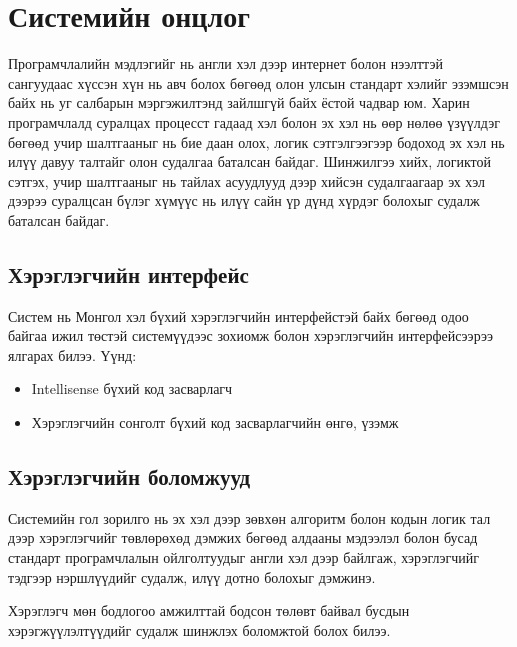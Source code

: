 \clearpage

\section{Системийн онцлог}
Програмчлалийн мэдлэгийг нь англи хэл дээр интернет болон нээлттэй сангуудаас хүссэн хүн нь авч болох бөгөөд олон улсын стандарт хэлийг эзэмшсэн байх нь уг салбарын мэргэжилтэнд зайлшгүй байх ёстой чадвар юм. Харин програмчлалд суралцах процесст гадаад хэл болон эх хэл нь өөр нөлөө үзүүлдэг бөгөөд учир шалтгааныг нь бие даан олох, логик сэтгэлгээгээр бодоход эх хэл нь илүү давуу талтайг олон судалгаа баталсан байдаг. Шинжилгээ хийх, логиктой сэтгэх, учир шалтгааныг нь тайлах асуудлууд дээр хийсэн судалгаагаар эх хэл дээрээ суралцсан бүлэг хүмүүс нь илүү сайн үр дүнд хүрдэг болохыг судалж баталсан байдаг\cite{motherLanguage}.

\subsection{Хэрэглэгчийн интерфейс}
Систем нь Монгол хэл бүхий хэрэглэгчийн интерфейстэй байх бөгөөд одоо байгаа ижил төстэй системүүдээс зохиомж болон хэрэглэгчийн интерфейсээрээ ялгарах билээ. Үүнд: 
\begin{itemize}
  \item Intellisense\footnotemark{}  бүхий код засварлагч
  \item Хэрэглэгчийн сонголт бүхий код засварлагчийн өнгө, үзэмж
\end{itemize}

\subsection{Хэрэглэгчийн боломжууд}
Системийн гол зорилго нь эх хэл дээр зөвхөн алгоритм болон кодын логик тал дээр хэрэглэгчийг төвлөрөхөд дэмжих бөгөөд алдааны мэдээлэл болон бусад стандарт програмчлалын ойлголтуудыг англи хэл дээр байлгаж, хэрэглэгчийг тэдгээр нэршлүүдийг судалж, илүү дотно болохыг дэмжинэ.

Хэрэглэгч мөн бодлогоо амжилттай бодсон төлөвт байвал бусдын хэрэгжүүлэлтүүдийг судалж шинжлэх боломжтой болох билээ.


